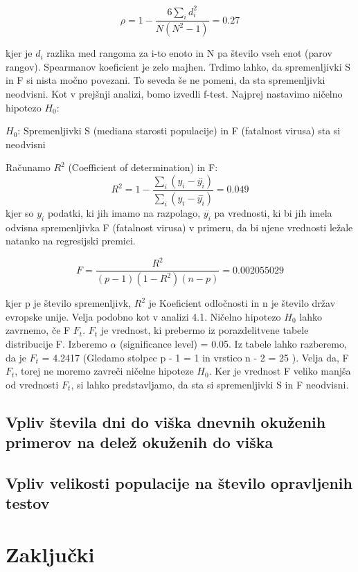 \documentclass[a4paper,11pt]{article}
\begin{document}
\begin{center}
\[\rho = 1 - \frac{6\sum_{i}{}d_i^2}{N(N^2 - 1)} = 0.27\]
\end{center} 
kjer je \( d_i \) razlika med rangoma za i-to enoto in N pa število vseh enot (parov rangov).
Spearmanov koeficient je zelo majhen. Trdimo lahko, da spremenljivki S in F si nista močno povezani. To seveda še ne pomeni, da sta spremenljivki neodvisni.  Kot v prejšnji analizi, bomo izvedli f-test. Najprej nastavimo ničelno hipotezo \( H_0 \):
\begin{center}
\( H_0 \): Spremenljivki S (mediana starosti populacije) in F (fatalnost virusa) sta si neodvisni
\end{center}
Računamo \( R^2 \) (Coefficient of determination) in F:
\[R^2 = 1 - \frac{\sum_{i}{}(y_i - \overset{..}{y_i})}{\sum_{i}{}(y_i - \overset{-}{y_i})} = 0.049\]
kjer so \(y_i\) podatki, ki jih imamo na razpolago, \(\overset{..}{y_i}\) pa vrednosti, ki bi jih imela odvisna spremenljivka F (fatalnost virusa) v primeru, da bi njene vrednosti ležale natanko na regresijski premici.

\[F = \frac{R^2}{(p - 1)(1 - R^2)(n - p)} = 0.002055029 \]

kjer p je število spremenljivk, \( R^2 \) je Koeficient odločnosti in n je število držav evropske unije. Velja podobno kot v analizi 4.1. Ničelno hipotezo \( H_0 \) lahko zavrnemo, če F \ge \(F_t \). \(F_t\) je vrednost, ki prebermo iz porazdelitvene tabele distribucije F. Izberemo \(\alpha\) (significance level) = 0.05. Iz tabele lahko razberemo, da je \( F_t \) = 4.2417 (Gledamo stolpec p - 1 = 1 in vrstico n - 2 = 25 ). Velja da, F \lt \(F_t\), torej ne moremo zavreči ničelne hipoteze \(H_0\). Ker je vrednost F veliko manjša od vrednosti \(F_t\), si lahko predstavljamo, da sta si spremenljivki S in F neodvisni.

\subsection{Vpliv števila dni do viška dnevnih okuženih primerov na delež okuženih do viška}
\subsection{Vpliv velikosti populacije na število opravljenih testov}


\section{Zaključki}
\end{document}
